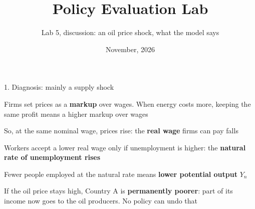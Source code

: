 \documentclass[aspectratio=169,xcolor=table]{beamer}
\title[Policy Evaluation Lab]{Policy Evaluation Lab}
\subtitle[Lab 5]{Lab 5, discussion: an oil price shock, what the model says}
\date[\pelYear]{November, 2026}
\begin{document}
\frame{\titlepage}

\begin{frame}{1. Diagnosis: mainly a supply shock}
\small
\bi
  \item Firms set prices as a \textbf{markup} over wages. When energy costs more, keeping the same profit means a higher markup over wages
  \item So, at the same nominal wage, prices rise: the \textbf{real wage} firms can pay falls
  \item Workers accept a lower real wage only if unemployment is higher: the \textbf{natural rate of unemployment rises}
  \item Fewer people employed at the natural rate means \textbf{lower potential output} $Y_n$
\ei
\vspace{0.1cm}
\begin{block}{}
If the oil price stays high, Country A is \textbf{permanently poorer}: part of its income now goes to the oil producers. No policy can undo that
\end{block}
\end{frame}
\end{document}
